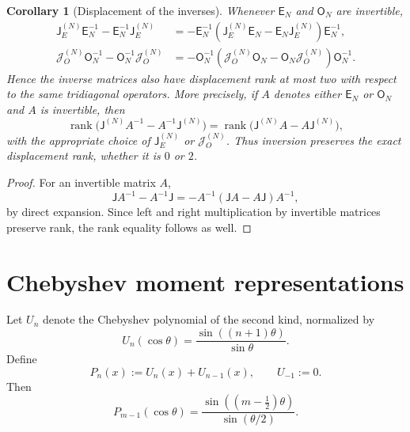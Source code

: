 \documentclass[11pt]{amsart}
\numberwithin{equation}{section}
\theoremstyle{plain}
\newtheorem{corollary}[theorem]{Corollary}
\theoremstyle{definition}
\theoremstyle{remark}
\newcommand{\E}{\mathsf E}
\newcommand{\Omat}{\mathsf O}
\newcommand{\J}{\mathsf J}
\newcommand{\rank}{\operatorname{rank}}
\begin{document}
\begin{corollary}[Displacement of the inverses]
\label{cor:inverse_displacement}
Whenever $\E_N$ and $\Omat_N$ are invertible,
\begin{align}
\J_E^{(N)}\E_N^{-1}-\E_N^{-1}\J_E^{(N)}
&=-\E_N^{-1}
\left(\J_E^{(N)}\E_N-\E_N\J_E^{(N)}\right)
\E_N^{-1},
\label{eq:E_inverse_displacement}\\
\mathcal J_O^{(N)}\Omat_N^{-1}-\Omat_N^{-1}\mathcal J_O^{(N)}
&=-\Omat_N^{-1}
\left(\mathcal J_O^{(N)}\Omat_N-\Omat_N\mathcal J_O^{(N)}\right)
\Omat_N^{-1}.
\label{eq:O_inverse_displacement}
\end{align}
Hence the inverse matrices also have displacement rank at most two with respect to the same tridiagonal operators.  More precisely, if $A$ denotes either $\E_N$ or $\Omat_N$ and $A$ is invertible, then
\begin{equation}
\rank\bigl(\J^{(N)}A^{-1}-A^{-1}\J^{(N)}\bigr)
=
\rank\bigl(\J^{(N)}A-A\J^{(N)}\bigr),
\label{eq:inverse_displacement_rank_equality}
\end{equation}
with the appropriate choice of $\J_E^{(N)}$ or $\mathcal J_O^{(N)}$.  Thus inversion preserves the exact displacement rank, whether it is $0$ or $2$.
\end{corollary}

\begin{proof}
For an invertible matrix \(A\),
\[
\J A^{-1}-A^{-1}\J=-A^{-1}(\J A-A\J)A^{-1},
\]
by direct expansion.  Since left and right multiplication by invertible
matrices preserve rank, the rank equality follows as well.
\end{proof}

\section{Chebyshev moment representations}
\label{sec:moment_representations}

Let $U_n$ denote the Chebyshev polynomial of the second kind, normalized by
\begin{equation}
U_n(\cos\theta)=\frac{\sin((n+1)\theta)}{\sin\theta}.
\label{eq:U_definition}
\end{equation}
Define
\begin{equation}
P_n(x):=U_n(x)+U_{n-1}(x),
\qquad U_{-1}:=0.
\label{eq:P_definition}
\end{equation}
Then
\begin{equation}
P_{m-1}(\cos\theta)
=\frac{\sin((m-\tfrac12)\theta)}{\sin(\theta/2)}.
\label{eq:P_sine_identity}
\end{equation}
\end{document}
